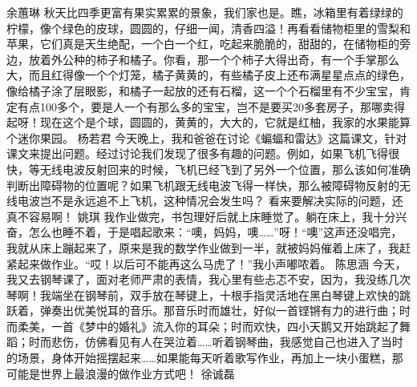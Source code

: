 \markdownRendererDocumentBegin
{}\markdownRendererInterblockSeparator
{}\markdownRendererInterblockSeparator
{}余蕙琳\markdownRendererInterblockSeparator
{}秋天比四季更富有果实累累的景象，我们家也是。瞧，冰箱里有着绿绿的柠檬，像个绿色的皮球，圆圆的，仔细一闻，清香四溢！再看看储物柜里的雪梨和苹果，它们真是天生绝配，一个白一个红，吃起来脆脆的，甜甜的，在储物柜的旁边，放着外公种的柿子和橘子。你看，那一个个柿子大得出奇，有一个手掌那么大，而且红得像一个个灯笼，橘子黄黄的，有些橘子皮上还布满星星点点的绿色，像给橘子涂了层眼影，和橘子一起放的还有石榴，这一个个石榴里有不少宝宝，肯定有点100多个，要是人一个有那么多的宝宝，岂不是要买20多套房子，那哪卖得起呀！现在这个是个球，圆圆的，黄黄的，大大的，它就是红柚，我家的水果能算个迷你果园。\markdownRendererInterblockSeparator
{}\markdownRendererInterblockSeparator
{}杨若君\markdownRendererInterblockSeparator
{}今天晚上，我和爸爸在讨论《蝙蝠和雷达》这篇课文，针对课文来提出问题。经过讨论我们发现了很多有趣的问题。例如，如果飞机飞得很快，等无线电波反射回来的时候，飞机已经飞到了另外一个位置，那么该如何准确判断出障碍物的位置呢？如果飞机跟无线电波飞得一样快，那么被障碍物反射的无线电波岂不是永远追不上飞机，这种情况会发生吗？\markdownRendererInterblockSeparator
{}看来要解决实际的问题，还真不容易啊！\markdownRendererInterblockSeparator
{}\markdownRendererInterblockSeparator
{}姚琪\markdownRendererInterblockSeparator
{}我作业做完，书包理好后就上床睡觉了。躺在床上，我十分兴奋，怎么也睡不着，于是唱起歌来：“噢，妈妈，噢……”呀！“噢”这声还没唱完，我就从床上蹦起来了，原来是我的数学作业做到一半，就被妈妈催着上床了，我赶紧起来做作业。“哎！以后可不能再这么马虎了！”我小声嘟哝着。\markdownRendererInterblockSeparator
{}\markdownRendererInterblockSeparator
{}陈思涵\markdownRendererInterblockSeparator
{}今天，我又去钢琴课了，面对老师严肃的表情，我心里有些忐忑不安，因为，我没练几次琴啊！我端坐在钢琴前，双手放在琴键上，十根手指灵活地在黑白琴键上欢快的跳跃着，弹奏出优美悦耳的音乐。那音乐时而雄壮，好似一首铿锵有力的进行曲；时而柔美，一首《梦中的婚礼》流入你的耳朵；时而欢快，四小天鹅又开始跳起了舞蹈；时而悲伤，仿佛看见有人在哭泣着……听着钢琴曲，我感觉自己也进入了当时的场景，身体开始摇摆起来……如果能每天听着歌写作业，再加上一块小蛋糕，那可能是世界上最浪漫的做作业方式吧！\markdownRendererInterblockSeparator
{}\markdownRendererInterblockSeparator
{}徐诚磊\markdownRendererInterblockSeparator
